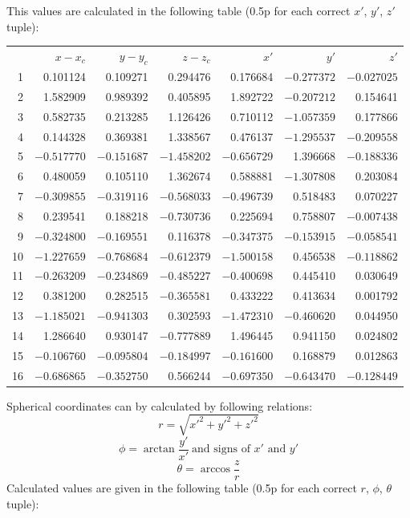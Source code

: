 \begin{description}
  This values are calculated in the following table (0.5p for each
  correct $x'$, $y'$, $z'$ tuple):

  \begin{center}
  \begin{tabular}{rrrrrrr}
  & $x - x_c$ & $y - y_c$ & $z - z_c$ & $x'$ & $y'$ & $z'$\\
  1 & 0.101124 & 0.109271 & 0.294476 & 0.176684 & $-0.277372$ & $-0.027025$\\
  2 & 1.582909 & 0.989392 & 0.405895 & 1.892722 & $-0.207212$ & 0.154641\\
  3 & 0.582735 & 0.213285 & 1.126426 & 0.710112 & $-1.057359$ & 0.177866\\
  4 & 0.144328 & 0.369381 & 1.338567 & 0.476137 & $-1.295537$ & $-0.209558$\\
  5 & $-0.517770$ & $-0.151687$ & $-1.458202$ & $-0.656729$ & 1.396668 & $-0.188336$\\
  6 & 0.480059 & 0.105110 & 1.362674 & 0.588881 & $-1.307808$ & 0.203084\\
  7 & $-0.309855$ & $-0.319116$ & $-0.568033$ & $-0.496739$ & 0.518483 & 0.070227\\
  8 & 0.239541 & 0.188218 & $-0.730736$ & 0.225694 & 0.758807 & $-0.007438$\\
  9 & $-0.324800$ & $-0.169551$ & 0.116378 & $-0.347375$ & $-0.153915$ & $-0.058541$\\
  10 & $-1.227659$ & $-0.768684$ & $-0.612379$ & $-1.500158$ & 0.456538 & $-0.118862$\\
  11 & $-0.263209$ & $-0.234869$ & $-0.485227$ & $-0.400698$ & 0.445410 & 0.030649\\
  12 & 0.381200 & 0.282515 & $-0.365581$ & 0.433222 & 0.413634 & 0.001792\\
  13 & $-1.185021$ & $-0.941303$ & 0.302593 & $-1.472310$ & $-0.460620$ & 0.044950\\
  14 & 1.286640 & 0.930147 & $-0.777889$ & 1.496445 & 0.941150 & 0.024802\\
  15 & $-0.106760$ & $-0.095804$ & $-0.184997$ & $-0.161600$ & 0.168879 & 0.012863\\
  16 & $-0.686865$ & $-0.352750$ & 0.566244 & $-0.697350$ & $-0.643470$ & $-0.128449$
  \end{tabular}
  \end{center}

\item[(d)] Spherical coordinates can by calculated by following
  relations:
  \[ r = \sqrt{x'^2 + y'^2 + z'^2} \]
  \[ \phi = \arctan\frac{y'}{x'}\ \text{and signs of $x'$ and $y'$} \]
  \[ \theta = \arccos\frac{z}{r} \]
  Calculated values are given in the following table (0.5p for each
  correct $r$, $\phi$, $\theta$ tuple):


\end{description}
